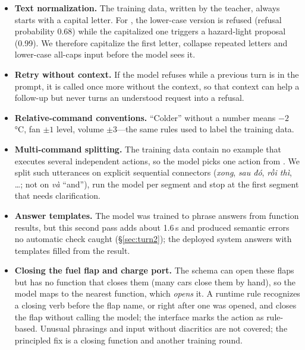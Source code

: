 \begin{itemize}
  \item \textbf{Text normalization.} The training data, written by the teacher, always starts with a capital letter. For
  , the lower-case version is refused (refusal
  probability 0.68) while the capitalized one triggers a hazard-light proposal (0.99). We therefore capitalize the first
  letter, collapse repeated letters and lower-case all-caps input before the model sees it.
  \item \textbf{Retry without context.} If the model refuses while a previous turn is in the prompt, it is called once more
  without the context, so that context can help a follow-up but never turns an understood request into a refusal.
  \item \textbf{Relative-command conventions.} ``Colder'' without a number means $-2$\,°C, fan $\pm1$ level, volume $\pm3$---the
  same rules used to label the training data.
  \item \textbf{Multi-command splitting.} The training data contain no example that executes several independent actions, so
  the model picks one action from . We split such utterances on explicit sequential connectors (\textit{xong}, \textit{sau
  đó}, \textit{rồi thì}, \ldots; not on \textit{và} ``and''), run the model per segment and stop at the first segment that
  needs clarification.
  \item \textbf{Answer templates.} The model was trained to phrase answers from function results, but this second pass adds
  about 1.6\,s and produced semantic errors no automatic check caught (\S\ref{sec:turn2}); the deployed system answers with
  templates filled from the result.
  \item \textbf{Closing the fuel flap and charge port.} The schema can open these flaps but has no function that closes them
  (many cars close them by hand), so the model maps  to the nearest function, which
  \emph{opens} it. A runtime rule recognizes a closing verb before the flap name, or  right after one was
  opened, and closes the flap without calling the model; the interface marks the action as rule-based. Unusual phrasings and
  input without diacritics are not covered; the principled fix is a closing function and another training round.
\end{itemize}

